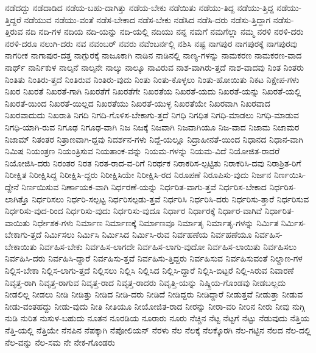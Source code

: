 {ನಡೆದದ್ದು
ನಡೆದಾಡಿದ
ನಡೆಯ-ಬಹು-ದಾಗಿತ್ತು
ನಡೆಯ-ಬೇಕು
ನಡೆಯಿತು
ನಡೆಯು-ತಿದ್ದ
ನಡೆಯು-ತ್ತಿದ್ದ
ನಡೆಯು-ತ್ತಿದ್ದರೆ
ನಡೆಯುವ
ನಡೆಯು-ವಂತೆ
ನಡೆಸ-ಬೇಕಾದ
ನಡೆಸ-ಬೇಕು
ನಡೆಸಿದ
ನಡೆಸಿ-ದರು
ನಡೆಸು-ತ್ತಿದ್ದಾಗ
ನಡೆಸು-ತ್ತಿರುವ
ನದಿ
ನದಿ-ಗಳ
ನದಿಯ
ನದಿ-ಯನ್ನು
ನದಿ-ಯಲ್ಲಿ
ನದಿಯು
ನನ್ನ
ನಮಗೆ
ನಮಗೆಲ್ಲಾ
ನಮ್ಮ
ನರಳಿ
ನರಳಿ-ದರು
ನರಳಿ-ದರೂ
ನಲುಗಿ-ದರು
ನವ
ನವಂಬರ್
ನವರು
ನವೆಂಬರ್ನಲ್ಲಿ
ನಶಿಸಿ
ನಷ್ಟ
ನಾಗಪುರ
ನಾಗಪುರಕ್ಕೆ
ನಾಗಪುರವು
ನಾಗರೀಕ
ನಾಗಾಪುರ-ದತ್ತ
ನಾಗ್ಪುರಕ್ಕೆ
ನಾಜೂಕಾಗಿ
ನಾಡಿನ
ನಾಡಿನಲ್ಲಿ
ನಾಣ್ಯ-ಗಳನ್ನು
ನಾಮಕರಣ
ನಾಮಕರಣ-ವಾದ
ನಾರ್ಥ್
ನಾರ್ನಿಕುಳ
ನಾಲ್ಕನೆ
ನಾಲ್ಕನೇ
ನಾಲ್ಕು
ನಾಲ್ಕೂ
ನಾವಿರುವ
ನಾಶ-ವಾಗಿರು-ತ್ತದೆ
ನಾಶ-ವಾದವು
ನಿಂತ
ನಿಂತರು
ನಿಂತಿತು
ನಿಂತಿರು-ತ್ತದೆ
ನಿಂತಿರುವ
ನಿಂತಿರು-ವುದು
ನಿಂತು
ನಿಂತು-ಕೊಳ್ಳಲು
ನಿಂತು-ಹೋಯಿತು
ನಿಕಟ
ನಿಕ್ಷೇಪ-ಗಳು
ನಿಖರ
ನಿಖರತೆ
ನಿಖರತೆ-ಗಾಗಿ
ನಿಖರತೆಗೆ
ನಿಖರತೆಗೇ
ನಿಖರತೆಯ
ನಿಖರತೆ-ಯದು
ನಿಖರತೆ-ಯನ್ನು
ನಿಖರತೆ-ಯಲ್ಲಿ
ನಿಖರತೆ-ಯಿಂದ
ನಿಖರತೆ-ಯಿಲ್ಲದ
ನಿಖರತೆಯು
ನಿಖರತೆ-ಯುಳ್ಳ
ನಿಖರತೆಯೇ
ನಿಖರವಾಗಿ
ನಿಖರವಾದ
ನಿಖರವಾದುದು
ನಿಖರಾತಿ
ನಿಗದಿ
ನಿಗದಿ-ಗೊಳಿಸ-ಬೇಕಾಗು-ತ್ತದೆ
ನಿಗಧಿ
ನಿಗಧಿತ
ನಿಗಧಿ-ಮಾಡಲು
ನಿಗಧಿ-ಮಾಡುವ
ನಿಗಧಿ-ಯಾಗಿ-ರುವ
ನಿಗೂಢ
ನಿಗೂಢ-ವಾಗಿ
ನಿಜ
ನಿಜಕ್ಕೆ
ನಿಜವಾಗಿ
ನಿಜವಾಗಿಯೂ
ನಿಜ-ವಾದ
ನಿಜಾಮ
ನಿಜಾಮರ
ನಿಜಾಮ್
ನಿತಂತರ
ನಿತ್ರಾಣವಾಗಿ-ದ್ದವು
ನಿದರ್ಶನ-ಗಳು
ನಿದ್ದೆ-ಯಲ್ಲೂ
ನಿದ್ರಾಹೀನತೆ-ಯಿಂದ
ನಿಧಾನದ
ನಿಧಾನ-ವಾಗಿ
ನಿಮಿಷ
ನಿಯಂತ್ರಣ
ನಿಯಂತ್ರಿಸುವ
ನಿಯತಾಂಕ-ವನ್ನು
ನಿಯಮ-ಗಳನ್ನು
ನಿಯಮ-ವಿದೆ
ನಿಯೋಜಿತ-ರಾದರೆ
ನಿಯೋಜಿಸಿ-ದರು
ನಿರಂತರ
ನಿರತ
ನಿರತ-ರಾದ-ವ-ರಿಗೆ
ನಿರರ್ಥಕ
ನಿರಾಕರಿಸ-ಲ್ಪಟ್ಟಿತು
ನಿರಾಕರಿಸಿ-ದವು
ನಿರಾಶ್ರಿತ-ರಿಗೆ
ನಿರೀಕ್ಷಿತ
ನಿರೀಕ್ಷಿಸಿದ್ದ
ನಿರೀಕ್ಷಿಸಿ-ದ್ದರು
ನಿರೀಕ್ಷಿಸಿಯೇ
ನಿರೀಕ್ಷಿಸಿ-ರದ
ನಿರೂಪಣೆ
ನಿರೂಪಿಸು-ವುದು
ನಿರ್ಜನ
ನಿರ್ಣಯಿಸಿ-ದ್ದೇನೆ
ನಿರ್ಣಯಿಸುವ
ನಿರ್ಣಾಯಕ-ವಾಗಿ
ನಿರ್ಧರಣೆ-ಯನ್ನು
ನಿರ್ಧರಿತ-ವಾಗು-ತ್ತವೆ
ನಿರ್ಧರಿಸ-ಬೇಕಾದ
ನಿರ್ಧರಿಸ-ಲಾಗಿತ್ತೊ
ನಿರ್ಧರಿಸಲು
ನಿರ್ಧರಿ-ಸಲ್ಪಟ್ಟ
ನಿರ್ಧರಿಸಲ್ಪಡು-ತ್ತವೆ
ನಿರ್ಧರಿಸಿ
ನಿರ್ಧರಿಸಿ-ದರು
ನಿರ್ಧರಿಸು-ತ್ತಾರೆ
ನಿರ್ಧರಿಸುವ
ನಿರ್ಧರಿಸು-ವುದ-ರಿಂದ
ನಿರ್ಧರಿಸು-ವುದು
ನಿರ್ಧರಿಸು-ವುದೂ
ನಿರ್ಧಾರ
ನಿರ್ಧಾರಕ್ಕೆ
ನಿರ್ಧಾರ-ವಾಗಿವೆ
ನಿರ್ಧಾರಿತ-ವಾಯಿತು
ನಿರ್ಧೇಶಕ-ಗಳು
ನಿರ್ಮಾಣ
ನಿರ್ಮಾಣಕ್ಕೆ
ನಿರ್ಮಾಣವೂ
ನಿರ್ಮಾತೃ
ನಿರ್ಮಾತೃ-ಗಳನ್ನು
ನಿರ್ಮಿತ
ನಿರ್ಮಿಸ-ಬೇಕಾಗು-ತ್ತದೆ
ನಿರ್ಮಿಸಲು
ನಿರ್ಮಿಸಿ
ನಿರ್ಮಿಸಿದ
ನಿರ್ಮಿಸಿ-ರುವ
ನಿರ್ವಹಣೆಯ
ನಿರ್ವಹಣೆಯೂ
ನಿರ್ವಹಿಸ-ಬೇಕಾಯಿತು
ನಿರ್ವಹಿಸ-ಬೇಕು
ನಿರ್ವಹಿಸ-ಲಾಗದೇ
ನಿರ್ವಹಿಸ-ಲಾಗು-ವುದೋ
ನಿರ್ವಹಿಸ-ಲಾಯಿತು
ನಿರ್ವಹಿಸಲು
ನಿರ್ವಹಿಸಿ-ದರು
ನಿರ್ವಹಿಸಿ-ದ್ದಾರೆ
ನಿರ್ವಹಿಸು-ತ್ತವೆ
ನಿರ್ವಹಿಸು-ತ್ತಿದ್ದರು
ನಿರ್ವಹಿಸುವ
ನಿರ್ವಹಿಸುವಂತೆ
ನಿಲ್ದಾಣ-ಗಳ
ನಿಲ್ಲಿಸ-ಬೇಕಾ
ನಿಲ್ಲಿಸ-ಲಾಗು-ತ್ತದೆ
ನಿಲ್ಲಿಸಲು
ನಿಲ್ಲಿಸಿ
ನಿಲ್ಲಿಸಿದ
ನಿಲ್ಲಿಸಿ-ದ್ದಾರೆ
ನಿಲ್ಲಿಸಿ-ಬಿಟ್ಟರೆ
ನಿಲ್ಲಿ-ಸಿರುವ
ನಿವಾರಣೆ
ನಿವೃತ್ತ-ರಾಗಿ
ನಿವೃತ್ತ-ರಾಗುವ
ನಿವೃತ್ತ-ರಾದ
ನಿವೃತ್ತ-ರಾದರು
ನಿವೃತ್ತಿ-ಯನ್ನು
ನಿಷ್ಕ್ರಿಯ-ಗೊಂಡವು
ನೀಡಬಲ್ಲದು
ನೀಡಲಿಲ್ಲ
ನೀಡಲು
ನೀಡಿ
ನೀಡಿತ್ತು
ನೀಡಿದ
ನೀಡಿ-ದರು
ನೀಡಿದೆ
ನೀಡಿದ್ದರು
ನೀಡಿದ್ದಾರೆ
ನೀಡುತ್ತವೆ
ನೀಡುತ್ತಾ
ನೀಡುವ
ನೀಡು-ವಂತಹದ್ದು
ನೀಡು-ವುದು
ನೀತಿ
ನೀತಿಯೂ
ನೀಯೋಜಿತ-ರಾದ
ನೀರನ್ನು
ನೀರಾ-ವರಿ
ನೀರಿನ
ನೀರು
ನೀವು
ನುಗ್ಗಿ
ನುಡಿ
ನುರಿತ
ನುಸುಳ-ಬಹುದು
ನೂತನ
ನೂರಡಿಯ
ನೂರಾರು
ನೂರು
ನೆಚ್ಚಿನ
ನೆಟ್ಟ
ನೆಟ್ಟಗೆ
ನೆಟ್ಟು
ನೆಡುವುದು
ನೆತ್ತಿಯ
ನೆತ್ತಿ-ಯಲ್ಲಿ
ನೆತ್ತಿಯೇ
ನೆನಪಿನ
ನೆಪಕ್ಕಾಗಿ
ನೆಪೋಲಿಯನ್
ನೆರಳು
ನೆಲ
ನೆಲಕ್ಕೆ
ನೆಲಕ್ಕೊರಗಿ
ನೆಲ-ಗಟ್ಟಿನ
ನೆಲದ
ನೆಲ-ದಲ್ಲಿ
ನೆಲ-ವನ್ನು
ನೆಲ-ಸಮ
ನೇ
ನೇಕ-ಗೊಂಡರು
}
